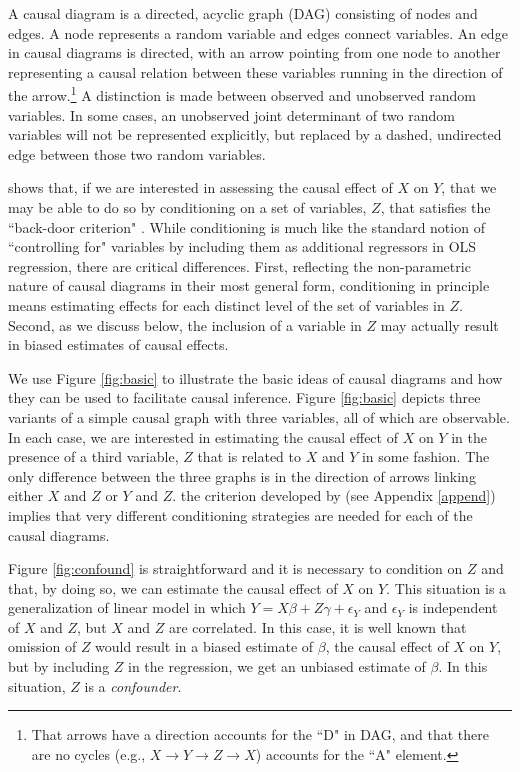 \documentclass[11pt,reqno,titlepage]{amsart}
\begin{document}
\begin{doublespace}
A causal diagram is a directed, acyclic graph (DAG) consisting of nodes and edges.
A node represents a random variable and edges connect variables.
An edge in causal diagrams is directed, with an arrow pointing from one node to another representing a causal relation between these variables running in the direction of the arrow.\footnote{
That arrows have a direction accounts for the ``D" in DAG, and that there are no cycles (e.g., $X \rightarrow Y \rightarrow Z \rightarrow X$) accounts for the ``A" element.}
A distinction is made between observed and unobserved random variables.
In some cases, an unobserved joint determinant of two random variables will not be represented explicitly, but replaced by a dashed, undirected edge between those two random variables.

\citet{Pearl:2009vo} shows that, if we are interested in assessing the causal effect of $X$ on $Y$, that we may be able to do so by conditioning on a set of variables, $Z$, that satisfies the ``back-door criterion" \citep[p.79]{Pearl:2009vo}.
While conditioning is much like the standard notion of ``controlling for" variables by including them as additional regressors in OLS regression, there are critical differences.
First, reflecting the non-parametric nature of causal diagrams in their most general form, conditioning in principle means estimating effects for each distinct level of the set of variables in $Z$.
Second, as we discuss below, the inclusion of a variable in $Z$ may actually result in biased estimates of causal effects. 	

We use Figure \ref{fig:basic} to illustrate the basic ideas of causal diagrams and how they can be used to facilitate causal inference.
Figure \ref{fig:basic} depicts three variants of a simple causal graph with three variables, all of which are observable.
In each case, we are interested in estimating the causal effect of $X$ on $Y$ in the presence of a third variable, $Z$ that is related to $X$ and $Y$ in some fashion.
The only difference between the three graphs is in the direction of arrows linking either $X$ and $Z$ or $Y$ and $Z$.
the criterion developed by \citep{Pearl:2009vo} (see Appendix \ref{append}) implies that very different conditioning strategies are needed for each of the causal diagrams.

Figure \ref{fig:confound} is straightforward and it is necessary to condition on $Z$ and that, by doing so, we can estimate the causal effect of $X$ on $Y$.
This situation is a generalization of linear model in which $Y = X \beta + Z \gamma + \epsilon_Y$ and $\epsilon_Y$ is independent of $X$ and $Z$, but $X$ and $Z$ are correlated.
In this case, it is well known that omission of $Z$ would result in a biased estimate of $\beta$, the causal effect of $X$ on $Y$, but by including $Z$ in the regression, we get an unbiased estimate of $\beta$.
In this situation, $Z$ is a \emph{confounder}.


\end{doublespace}
\end{document}
